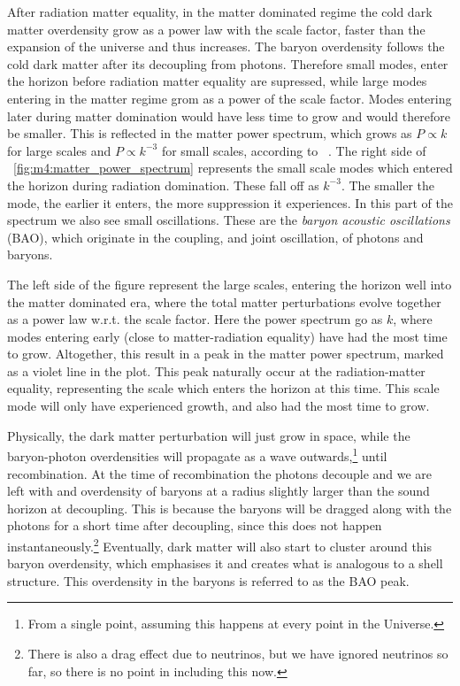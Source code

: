         After radiation matter equality, in the matter dominated regime the cold dark matter overdensity grow as a power law with the scale factor, faster than the expansion of the universe and thus increases. The baryon overdensity follows the cold dark matter after its decoupling from photons. Therefore small modes, enter the horizon before radiation matter equality are supressed, while large modes entering in the matter regime grom as a power of the scale factor. Modes entering later during matter domination would have less time to grow and would therefore be smaller.  This is reflected in the matter power spectrum, which grows as $P\propto k$ for large scales and $P\propto k^{-3}$ for small scales, according to ~\cite{dodelson2020modern}. The right side of ~\cref{fig:m4:matter_power_spectrum} represents the small scale modes which entered the horizon during radiation domination. These fall off as $k^{-3}$. The smaller the mode, the earlier it enters, the more suppression it experiences. In this part of the spectrum we also see small oscillations. These are the \textit{baryon acoustic oscillations} (BAO), which originate in the coupling, and joint oscillation, of photons and baryons. 
        
        The left side of the figure represent the large scales, entering the horizon well into the matter dominated era, where the total matter perturbations evolve together as a power law w.r.t. the scale factor. Here the power spectrum go as $k$, where modes entering early (close to matter-radiation equality) have had the most time to grow. Altogether, this result in a peak in the matter power spectrum, marked as a violet line in the plot. This peak naturally occur at the radiation-matter equality, representing the scale which enters the horizon at this time. This scale mode will only have experienced growth, and also had the most time to grow. 

        Physically, the dark matter perturbation will just grow in space, while the baryon-photon overdensities will propagate as a wave outwards,\footnote{From a single point, assuming this happens at every point in the Universe.} until recombination. At the time of recombination the photons decouple and we are left with and overdensity of baryons at a radius slightly larger than the sound horizon at decoupling. This is because the baryons will be dragged along with the photons for a short time after decoupling, since this does not happen instantaneously.\footnote{There is also a drag effect due to neutrinos, but we have ignored neutrinos so far, so there is no point in including this now.} Eventually, dark matter will also start to cluster around this baryon overdensity, which emphasises it and creates what is analogous to a shell structure. This overdensity in the baryons is referred to as the BAO peak. 

